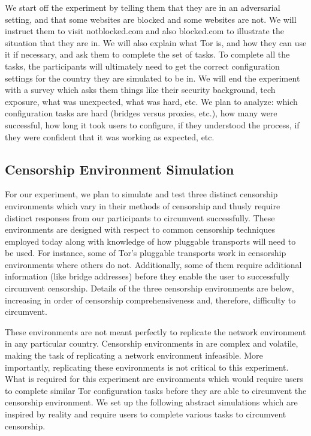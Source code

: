 \documentclass[letterpaper,twocolumn,10pt]{article}
\begin{document}
We start off the experiment by telling them that they are in an adversarial setting, and that some websites are blocked and some websites are not. We will instruct them to visit notblocked.com and also blocked.com to illustrate the situation that they are in. We will also explain what Tor is, and how they can use it if necessary, and ask them to complete the set of tasks. To complete all the tasks, the participants will ultimately need to get the correct configuration settings for the country they are simulated to be in. We will end the experiment with a survey which asks them things like their security background, tech exposure, what was unexpected, what was hard, etc. We plan to analyze: which configuration tasks are hard (bridges versus proxies, etc.), how many were successful, how long it took users to configure, if they understood the process, if they were confident that it was working as expected, etc. 

\subsection{Censorship Environment Simulation}
For our experiment, we plan to simulate and test three distinct censorship environments
which vary in their methods of censorship and thusly require distinct responses from our 
participants to circumvent successfully. These environments are designed with respect to 
common censorship techniques employed 
today along with knowledge of how pluggable transports will need to be used.
For instance, some of Tor's pluggable transports work in censorship environments
where others do not. Additionally, some of them require additional information (like bridge 
addresses) before they enable the user to successfully circumvent censorship. 
Details of the three censorship environments are below, increasing in 
order of censorship comprehensiveness and, therefore, difficulty to circumvent. 

These environments are not meant perfectly to replicate the network environment
in any particular country.  Censorship environments in are complex and volatile, making
the task of replicating a network environment infeasible. More importantly, replicating these
environments is not critical to this experiment. What is required for this experiment are 
environments which would require users to complete similar Tor configuration 
tasks before they are able to circumvent the censorship environment. We set up the following 
abstract simulations which are inspired by reality and require users to complete various tasks
to circumvent censorship. 
\end{document}
